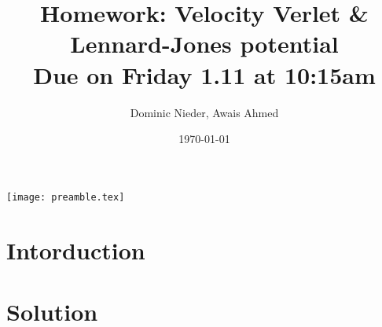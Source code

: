 \texttt{[image: preamble.tex]}

\lstset{style=mystyle}

\title{
    \vspace{2in}
    \textmd{\textbf{Homework: Velocity Verlet \& Lennard-Jones potential}}\\
    \normalsize\vspace{0.1in}\small{Due on Friday 1.11 at 10:15am}\\
    \vspace{0.1in}
    \vspace{3in}
}

\author{Dominic Nieder, Awais Ahmed}
\date{\today}



\maketitle

\section{Intorduction}



\section{Solution}


